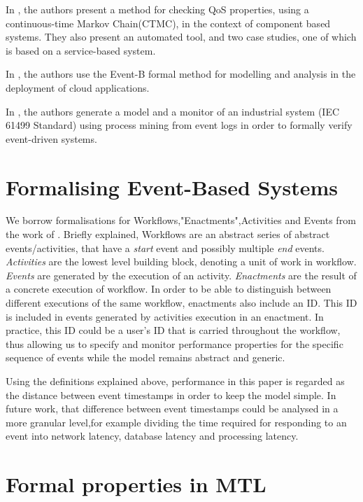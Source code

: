 \documentclass[twocolumn]{article}
\begin{document}
In \cite{paterson_observation-enhanced_2018}, the authors present a method for checking QoS properties, using a continuous-time Markov Chain(CTMC), in the context of component based systems. They also present an automated tool, and two case studies, one of which is based on a service-based system.

In \cite{mammar_formal_2024}, the authors use the Event-B formal method for modelling and analysis in the deployment of cloud applications.

In \cite{xavier_framework_2024}, the authors generate a model and a monitor of an industrial system ({IEC 61499 Standard}) using process mining from event logs in order to formally verify event-driven systems.


\section{Formalising Event-Based Systems}
We borrow formalisations for Workflows,"Enactments",Activities and Events from the work of \cite{mackey_early_2024}. Briefly explained, Workflows are an abstract series of abstract events/activities, that have a {\it start} event and possibly multiple {\it end} events.
\emph{Activities} are the lowest level building block, denoting a unit of work in workflow.
\emph{Events} are generated by the execution of an activity.
\emph{Enactments} are the result of a concrete execution of workflow. In order to be able to distinguish between different executions of the same workflow, enactments also include an ID.
This ID is included in events generated by activities execution in an enactment. In practice, this ID could be a user's ID that is carried throughout the workflow, thus allowing us to specify and monitor performance properties for the specific sequence of events while the model remains abstract and generic.

\par
Using the definitions explained above, performance in this paper is regarded as the distance between event timestamps
in order to keep the model simple.
In future work, that difference between event timestamps could be analysed in a more granular level,for example dividing the time required for responding to an event into network latency, database latency and processing latency.

\section{Formal properties in MTL}
\end{document}
